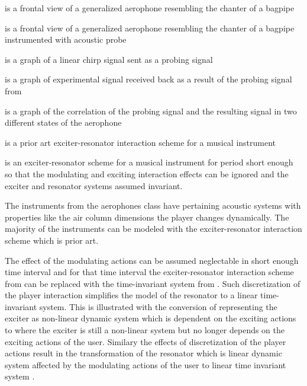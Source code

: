 \pa
{} is a frontal view of a generalized aerophone resembling the chanter of a bagpipe

\pa
{} is a frontal view of a generalized aerophone resembling the chanter of a bagpipe instrumented with acoustic probe

\pa
{} is a graph of a linear chirp signal sent as a probing signal

\pa
{} is a graph of experimental signal received back as a result of the probing signal from 

\pa
{} is a graph of the correlation of the probing signal and the resulting signal in two different states of the aerophone

\pa
{} is a prior art exciter-resonator interaction scheme for a musical instrument

\pa
{} is an exciter-resonator scheme for a musical instrument for period short enough so that the modulating and exciting interaction effects can be ignored and the exciter and resonator systems assumed invariant.





\pa
The instruments from the aerophones class have pertaining acoustic systems with properties like the air column dimensions the player changes dynamically. The majority of the instruments can be modeled with the exciter-resonator interaction scheme  which is prior art.

\pa
The effect of the modulating actions can be assumed neglectable in short enough time interval and for that time interval the exciter-resonator interaction scheme from  can be replaced with the time-invariant system from . Such discretization of the player interaction simplifies the model of the resonator to a linear time-invariant system. This is illustrated with the conversion of  representing the exciter as non-linear dynamic system which is dependent on the exciting actions to  where the exciter is still a non-linear system but no longer depends on the exciting actions of the user. Similary the effects of discretization of the player actions result in the transformation of the resonator  which is linear dynamic system affected by the modulating actions of the user to linear time invariant system . 

